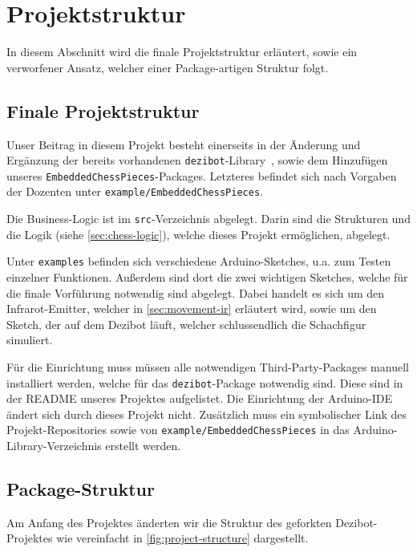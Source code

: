 
\section{Projektstruktur}

In diesem Abschnitt wird die finale Projektstruktur erläutert, sowie ein verworfener Ansatz, welcher einer Package-artigen Struktur folgt.


\subsection{Finale Projektstruktur}

Unser Beitrag in diesem Projekt besteht einerseits in der Änderung und Ergänzung der bereits vorhandenen \texttt{dezibot}-Library~\cite{dezibotteamDezibotDezibot2025}, sowie dem Hinzufügen unseres \texttt{EmbeddedChessPieces}-Packages. Letzteres befindet sich nach Vorgaben der Dozenten unter \texttt{example/EmbeddedChessPieces}.

Die Business-Logic ist im \texttt{src}-Verzeichnis abgelegt. Darin sind die Strukturen und die Logik (siehe \autoref{sec:chess-logic}), welche dieses Projekt ermöglichen, abgelegt.

Unter \texttt{examples} befinden sich verschiedene Arduino-Sketches, u.a. zum Testen einzelner Funktionen. Außerdem sind dort die zwei wichtigen Sketches, welche für die finale Vorführung notwendig sind abgelegt. Dabei handelt es sich um den Infrarot-Emitter, welcher in \autoref{sec:movement-ir} erläutert wird, sowie um den Sketch, der auf dem Dezibot läuft, welcher schlussendlich die Schachfigur simuliert.

Für die Einrichtung muss müssen alle notwendigen Third-Party-Packages manuell installiert werden, welche für das \texttt{dezibot}-Package notwendig sind. Diese sind in der README unseres Projektes aufgelistet. Die Einrichtung der Arduino-IDE ändert sich durch dieses Projekt nicht. Zusätzlich muss ein symbolischer Link des Projekt-Repositories sowie von \texttt{example/EmbeddedChessPieces} in das Arduino-Library-Verzeichnis erstellt werden.


\subsection{Package-Struktur}

Am Anfang des Projektes änderten wir die Struktur des geforkten Dezibot-Projektes wie vereinfacht in \autoref{fig:project-structure} dargestellt.


